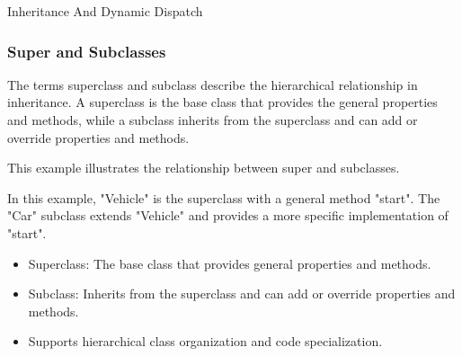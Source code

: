 \begin{notes}{Inheritance And Dynamic Dispatch}
\begin{highlight}[Inheritance]
    \end{highlight}
    
    \subsubsection*{Super and Subclasses}
    
    The terms superclass and subclass describe the hierarchical relationship in inheritance. A superclass is the base class that provides the general properties and methods, while a subclass inherits from the superclass and can add or override properties and methods.
    
    \begin{highlight}
    
        This example illustrates the relationship between super and subclasses.
    
    
        In this example, "Vehicle" is the superclass with a general method "start". The "Car" subclass extends "Vehicle" and provides a more specific implementation of "start".
    
        \begin{itemize}
            \item Superclass: The base class that provides general properties and methods.
            \item Subclass: Inherits from the superclass and can add or override properties and methods.
            \item Supports hierarchical class organization and code specialization.
        \end{itemize}
    
    \end{highlight}
    

\end{notes}
